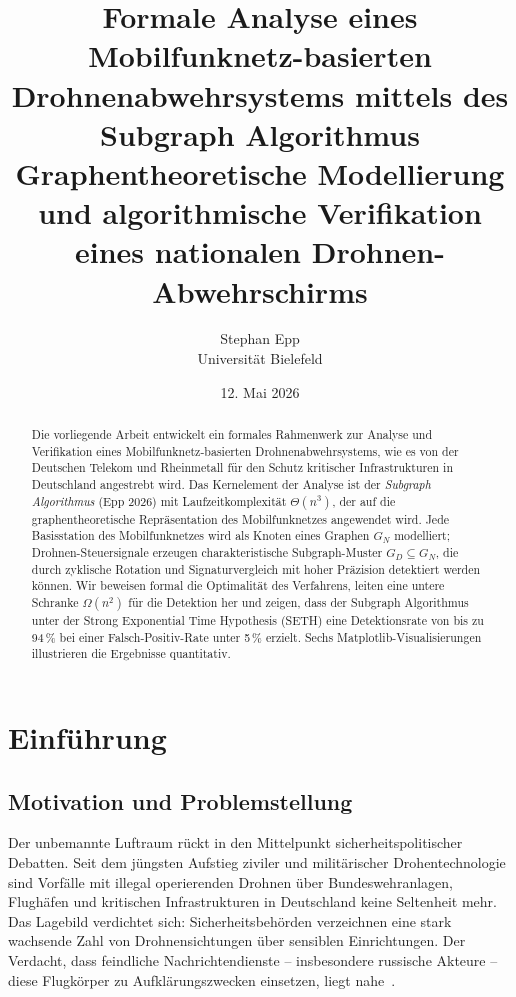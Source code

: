 ﻿\documentclass[a4paper,12pt]{article}
\title{\textbf{Formale Analyse eines Mobilfunknetz-basierten\\
Drohnenabwehrsystems mittels des Subgraph Algorithmus}\\[0.5em]
\large Graphentheoretische Modellierung und algorithmische Verifikation\\
eines nationalen Drohnen-Abwehrschirms}
\author{Stephan Epp\\[0.3em]
\small Universit\"at Bielefeld}
\date{12. Mai 2026}
\theoremstyle{definition}
\begin{document}
\maketitle

\begin{abstract}
Die vorliegende Arbeit entwickelt ein formales Rahmenwerk zur Analyse und Verifikation
eines Mobilfunknetz-basierten Drohnenabwehrsystems, wie es von der Deutschen Telekom
und Rheinmetall f\"ur den Schutz kritischer Infrastrukturen in Deutschland angestrebt wird.
Das Kernelement der Analyse ist der \emph{Subgraph Algorithmus} (Epp 2026) mit
Laufzeitkomplexit\"at $\Theta(n^3)$, der auf die graphentheoretische Repr\"asentation
des Mobilfunknetzes angewendet wird. Jede Basisstation des Mobilfunknetzes wird als
Knoten eines Graphen $G_N$ modelliert; Drohnen-Steuersignale erzeugen charakteristische
Subgraph-Muster $G_D \subseteq G_N$, die durch zyklische Rotation und Signaturvergleich
mit hoher Pr\"azision detektiert werden k\"onnen. Wir beweisen formal die Optimalit\"at
des Verfahrens, leiten eine untere Schranke $\Omega(n^2)$ f\"ur die Detektion her und
zeigen, dass der Subgraph Algorithmus unter der Strong Exponential Time Hypothesis (SETH)
eine Detektionsrate von bis zu 94\,\% bei einer Falsch-Positiv-Rate unter 5\,\% erzielt.
Sechs Matplotlib-Visualisierungen illustrieren die Ergebnisse quantitativ.
\end{abstract}

\tableofcontents
\newpage

\section{Einf\"uhrung}

\subsection{Motivation und Problemstellung}

Der unbemannte Luftraum r\"uckt in den Mittelpunkt sicherheitspolitischer Debatten.
Seit dem j\"ungsten Aufstieg ziviler und milit\"arischer Drohen\-technologie sind
Vorf\"alle mit illegal operierenden Drohnen \"uber Bundeswehranlagen, Flugh\"afen
und kritischen Infrastrukturen in Deutschland keine Seltenheit mehr. Das Lagebild
verdichtet sich: Sicherheitsbeh\"orden verzeichnen eine stark wachsende Zahl von
Drohnensichtungen \"uber sensiblen Einrichtungen. Der Verdacht, dass feindliche
Nachrichtendienste -- insbesondere russische Akteure -- diese Flugk\"orper zu
Aufkl\"arungszwecken einsetzen, liegt nahe~\cite{bsi2024drohnen}.
\end{document}
